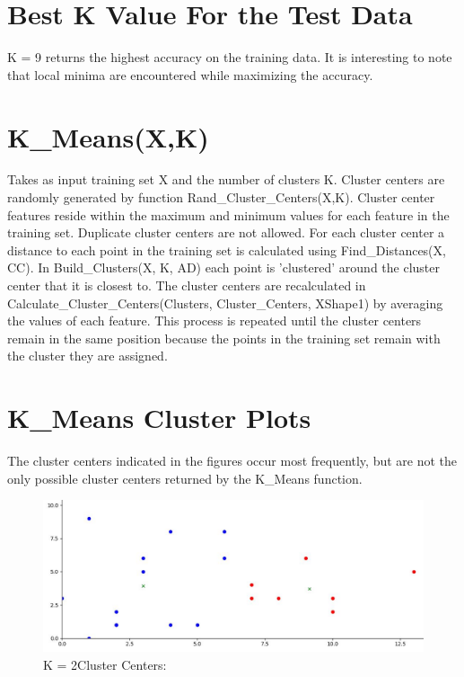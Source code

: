 \documentclass{article}
\begin{document}
\section{Best K Value For the Test Data}
K = 9 returns the highest accuracy on the training data. It is interesting to note that local minima are encountered while maximizing the accuracy.

\section{K\_Means(X,K)}
Takes as input training set X and the number of clusters K. Cluster centers are randomly generated by function Rand\_Cluster\_Centers(X,K). Cluster center features reside within the maximum and minimum values for each feature in the training set. Duplicate cluster centers are not allowed. For each cluster center a distance to each point in the training set is calculated using Find\_Distances(X, CC). In Build\_Clusters(X, K, AD) each point is 'clustered' around the cluster center that it is closest to. The cluster centers are recalculated in Calculate\_Cluster\_Centers(Clusters, Cluster\_Centers, XShape1) by averaging the values of each feature. This process is repeated until the cluster centers remain in the same position because the points in the training set remain with the cluster they are assigned. 

\section{K\_Means Cluster Plots}
The cluster centers indicated in the figures occur most frequently, but are not the only possible cluster centers returned by the K\_Means function.
\begin{figure}[h!]
\centering
\includegraphics[scale=.5]{cluster_k2}
\caption{K = 2\newline Cluster Centers: \newline[9.142857142857142, 3.7142857142857144]\newline[3.0, 3.923076923076923]}
\label{fig:universe}
\end{figure}
\end{document}
